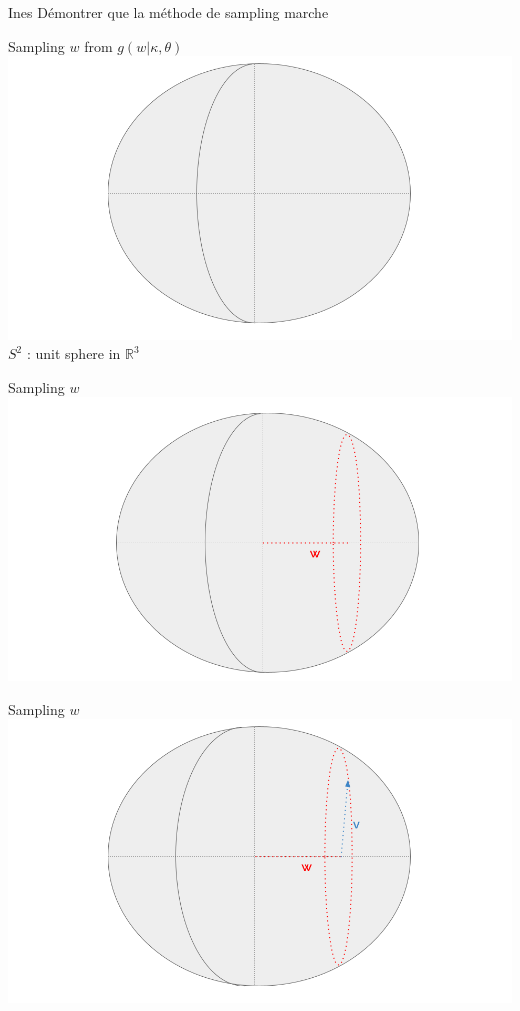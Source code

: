 \begin{frame}{Ines}
    Démontrer que la méthode de sampling marche
  
  
  \end{frame}
  
  \begin{frame}{Sampling $w$ from $g(w|\kappa, \theta)$}
    \centering
    \includegraphics[width=\textwidth]{figures/illustration_sampling_1.png}
    $S^{2}$ : unit sphere in $\mathbb{R}^{3}$
  \end{frame}
\begin{frame}{Sampling $w$}
  \centering
  \includegraphics[width=\textwidth]{figures/illustration_sampling_2.png}  
\end{frame}

\begin{frame}{Sampling $w$}
  \centering
  \includegraphics[width=\textwidth]{figures/illustration_sampling_3.png}
\end{frame}

